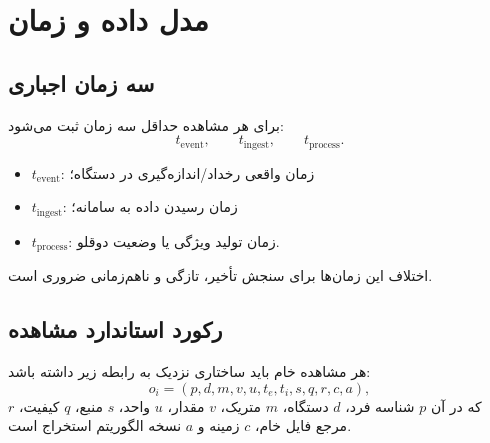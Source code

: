 \documentclass[11pt,a4paper]{article}
\begin{document}
\section{مدل داده و زمان}

\subsection{سه زمان اجباری}
برای هر مشاهده حداقل سه زمان ثبت می‌شود:
\begin{equation}
 t_{\mathrm{event}},\qquad t_{\mathrm{ingest}},\qquad t_{\mathrm{process}}.
\end{equation}
\begin{itemize}
  \item $t_{\mathrm{event}}$: زمان واقعی رخداد/اندازه‌گیری در دستگاه؛
  \item $t_{\mathrm{ingest}}$: زمان رسیدن داده به سامانه؛
  \item $t_{\mathrm{process}}$: زمان تولید ویژگی یا وضعیت دوقلو.
\end{itemize}
اختلاف این زمان‌ها برای سنجش تأخیر، تازگی و ناهم‌زمانی ضروری است.

\subsection{رکورد استاندارد مشاهده}
هر مشاهده خام باید ساختاری نزدیک به رابطه زیر داشته باشد:
\begin{equation}
 o_i=(p,d,m,v,u,t_e,t_i,s,q,r,c,a),
\end{equation}
که در آن $p$ شناسه فرد، $d$ دستگاه، $m$ متریک، $v$ مقدار، $u$ واحد، $s$ منبع، $q$ کیفیت، $r$ مرجع فایل خام، $c$ زمینه و $a$ نسخه الگوریتم استخراج است.
\end{document}
